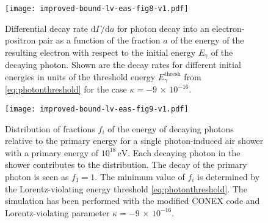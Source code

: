 \documentclass[aps,prd,preprint,longbibliography]{revtex4-1}
\begin{document}
\begin{appendix}
\begin{figure}[h]
\vspace*{-2mm}
\centering
\texttt{[image: improved-bound-lv-eas-fig8-v1.pdf]}
\vspace*{-4mm}
\caption{Differential decay rate $\text{d}\Gamma/\text{d}a$
for photon decay into an electron-positron pair as
a function of the fraction $a$ of the energy of the resulting
electron with respect to the initial energy $E_\gamma$ of the
decaying photon. Shown are the decay rates for different
initial energies in units of the threshold energy $E^\text{thresh}_\gamma$
from \eqref{eq:photonthreshold} for the case $\kappa=-9\,\times\,10^{-16}$.}
\label{fig:energydistribution}%
\end{figure}
\begin{figure}[h!]
\centering
\texttt{[image: improved-bound-lv-eas-fig9-v1.pdf]}
\vspace*{-4mm}
\caption{Distribution of fractions $f_i$ of the energy of decaying photons
relative to the primary energy for a single photon-induced
air shower with a primary energy of $10^{18}\,\text{eV}$.
Each decaying photon in
the shower contributes to the distribution. The decay of the
primary photon is seen as $f_1 = 1$. The minimum value of $f_i$
is determined by the Lorentz-violating
energy threshold \eqref{eq:photonthreshold}.
The simulation has been performed with the modified CONEX code and
Lorentz-violating parameter $\kappa=-9\,\times\,10^{-16}$.}
\label{fig:energyfraction}%
\vspace*{0cm}
\end{figure}
\end{appendix}

%
%
%

\end{document}
